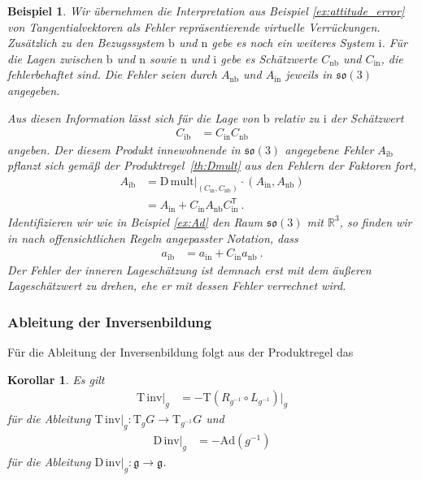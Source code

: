 \documentclass[10pt,a4paper]{article}
\theoremstyle{mytheorem}
\newtheorem{corollary}[theorem]{Korollar}
\theoremstyle{mydefinition}
\newtheorem{example}[theorem]{Beispiel}
\newcommand{\trans}{^\mathsf{T}}
\newcommand{\Dt}{\mathrm{D}}
\newcommand{\Tt}{\mathrm{T}}
\newcommand{\Ad}{\mathrm{Ad}}
\newcommand{\fso}{\mathfrak{so}}
\newcommand{\body}{\mathrm{b}}
\newcommand{\nav}{\mathrm{n}}
\newcommand{\inert}{\mathrm{i}}
\begin{document}
\begin{example}
\label{ex:attitude_mult}
Wir übernehmen die Interpretation aus Beispiel \ref{ex:attitude_error} von Tangentialvektoren als Fehler repräsentierende virtuelle Verrückungen.
Zusätzlich zu den Bezugssystem $\body$ und $\nav$ gebe es noch ein weiteres System $\inert$.
Für die Lagen zwischen $\body$ und $\nav$ sowie $\nav$ und $\inert$ gebe es Schätzwerte $C_{\nav\body}$ und $C_{\inert\nav}$, die fehlerbehaftet sind.
Die Fehler seien durch $A_{\nav\body}$ und $A_{\inert\nav}$ jeweils in $\fso(3)$ angegeben.

Aus diesen Information lässt sich für die Lage von $\body$ relativ zu $\inert$ der Schätzwert
\begin{align*}
	C_{\inert\body}
	&= C_{\inert\nav} C_{\nav\body}
\end{align*}
angeben.
Der diesem Produkt innewohnende in $\fso(3)$ angegebene Fehler $A_{\inert\body}$ pflanzt sich gemäß der Produktregel~\ref{th:Dmult} aus den Fehlern der Faktoren fort,
\begin{align*}
	A_{\inert\body}
	&=
	\Dt\,\mathrm{mult}|_{(C_{\inert\nav}, C_{\nav\body})}
	\cdot (A_{\inert\nav}, A_{\nav\body})
	\nonumber\\
	&=
	A_{\inert\nav} + C_{\inert\nav}A_{\nav\body}C_{\inert\nav}\trans
	\ .
\end{align*}
Identifizieren wir wie in Beispiel \ref{ex:Ad} den Raum $\fso(3)$ mit $\mathbb{R}^3$, so finden wir in nach offensichtlichen Regeln angepasster Notation, dass
\begin{align*}
	a_{\inert\body}
	&=
	a_{\inert\nav} + C_{\inert\nav}a_{\nav\body}
	\ .
\end{align*}
Der Fehler der inneren Lageschätzung ist demnach erst mit dem äußeren Lageschätzwert zu drehen, ehe er mit dessen Fehler verrechnet wird.

\end{example}

\subsubsection{Ableitung der Inversenbildung}

Für die Ableitung der Inversenbildung folgt aus der Produktregel das
\begin{corollary}
\label{th:DInv}
Es gilt
\begin{align*}
	\Tt\,\mathrm{inv}|_{g}
	&= -\Tt (R_{g^{-1}}\circ L_{g^{-1}})|_g
\end{align*}
für die Ableitung $\Tt\,\mathrm{inv}|_{g}:\Tt_gG\rightarrow\Tt_{g^{-1}}G$
und
\begin{align*}
	\Dt\,\mathrm{inv}|_{g}
	&= -\Ad(g^{-1})
\end{align*}
für die Ableitung $\Dt\,\mathrm{inv}|_{g}:\mathfrak{g}\rightarrow\mathfrak{g}$.
\end{corollary}
\end{document}
